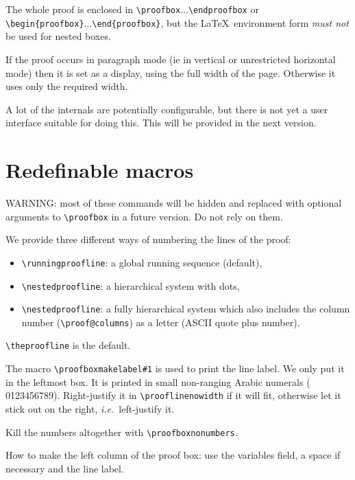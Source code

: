 \documentclass{article}
\begin{document}
  The whole proof is enclosed in \verb/\proofbox/...\verb/\endproofbox/
  or \verb/\begin{proofbox}/...\verb/\end{proofbox}/, but the \LaTeX\
  environment form {\em must not\/} be used for nested boxes.

  If the proof occurs in paragraph mode (ie in vertical or
  unrestricted horizontal mode) then it is set as a display, using the
  full width of the page. Otherwise it uses only the required width.

  A lot of the internals are potentially configurable, but there is not
  yet a user interface suitable for doing this. This will be provided
  in the next version.


\section{Redefinable macros}
 WARNING: most of these commands will be hidden and replaced with
 optional arguments to \verb/\proofbox/ in a future version.
 Do not rely on them.

 We provide three different ways of numbering the lines of the proof:
 \begin{itemize}
 \item \verb/\runningproofline/: a global running sequence (default),
 
 \item \verb/\nestedproofline/: a hierarchical system with dots,

 \item \verb/\nestedproofline/: a fully hierarchical system which
 also includes the column number
 (\verb/\proof@columns/) as a letter (ASCII quote plus number).

 \end{itemize}
 \verb/\theproofline/ is the default.

 The macro \verb/\proofboxmakelabel#1/ is used to print the line label.
 We only put it in the leftmost box.
 It is printed in small non-ranging Arabic numerals
 ({\the{} 0123456789}).
 Right-justify it in \verb/\prooflinenowidth/ if it will fit,
 otherwise let it stick out on the right, {\em i.e.}~left-justify it.

 Kill the numbers altogether with \verb/\proofboxnonumbers/.

 How to make the left column of the proof box:
 use the variables field, a space if necessary and the line label.
\end{document}
